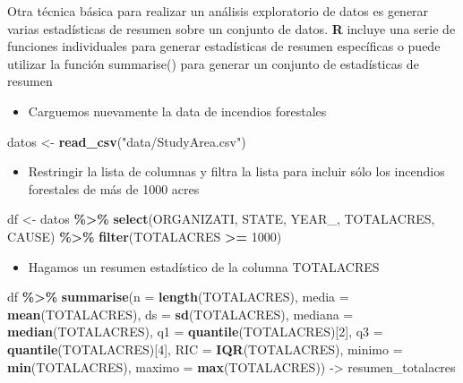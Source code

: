 \documentclass[
]{book}
\newenvironment{Shaded}{\begin{snugshade}}{\end{snugshade}}
\newcommand{\AttributeTok}[1]{\textcolor[rgb]{0.13,0.29,0.53}{#1}}
\newcommand{\DecValTok}[1]{\textcolor[rgb]{0.00,0.00,0.81}{#1}}
\newcommand{\FunctionTok}[1]{\textcolor[rgb]{0.13,0.29,0.53}{\textbf{#1}}}
\newcommand{\NormalTok}[1]{#1}
\newcommand{\OtherTok}[1]{\textcolor[rgb]{0.56,0.35,0.01}{#1}}
\newcommand{\SpecialCharTok}[1]{\textcolor[rgb]{0.81,0.36,0.00}{\textbf{#1}}}
\newcommand{\StringTok}[1]{\textcolor[rgb]{0.31,0.60,0.02}{#1}}
\providecommand{\tightlist}{%
  \setlength{\itemsep}{0pt}\setlength{\parskip}{0pt}}
\begin{document}
Otra técnica básica para realizar un análisis exploratorio de datos es generar varias estadísticas de resumen sobre un conjunto de datos. \textbf{R} incluye una serie de funciones individuales para generar estadísticas de resumen específicas o puede utilizar la función summarise() para generar un conjunto de estadísticas de resumen

\begin{itemize}
\tightlist
\item
  Carguemos nuevamente la data de incendios forestales
\end{itemize}

\begin{Shaded}
\begin{Highlighting}[]
\NormalTok{datos }\OtherTok{\textless{}{-}} \FunctionTok{read\_csv}\NormalTok{(}\StringTok{"data/StudyArea.csv"}\NormalTok{)}
\end{Highlighting}
\end{Shaded}

\begin{itemize}
\tightlist
\item
  Restringir la lista de columnas y filtra la lista para incluir sólo los incendios forestales de más de 1000 acres
\end{itemize}

\begin{Shaded}
\begin{Highlighting}[]
\NormalTok{df }\OtherTok{\textless{}{-}}\NormalTok{ datos }\SpecialCharTok{\%\textgreater{}\%}
  \FunctionTok{select}\NormalTok{(ORGANIZATI, STATE, YEAR\_, TOTALACRES, CAUSE) }\SpecialCharTok{\%\textgreater{}\%} 
  \FunctionTok{filter}\NormalTok{(TOTALACRES }\SpecialCharTok{\textgreater{}=} \DecValTok{1000}\NormalTok{)}
\end{Highlighting}
\end{Shaded}

\begin{itemize}
\tightlist
\item
  Hagamos un resumen estadístico de la columna TOTALACRES
\end{itemize}

\begin{Shaded}
\begin{Highlighting}[]
\NormalTok{df }\SpecialCharTok{\%\textgreater{}\%} 
  \FunctionTok{summarise}\NormalTok{(}\AttributeTok{n =} \FunctionTok{length}\NormalTok{(TOTALACRES),}
            \AttributeTok{media =} \FunctionTok{mean}\NormalTok{(TOTALACRES),}
            \AttributeTok{ds =} \FunctionTok{sd}\NormalTok{(TOTALACRES),}
            \AttributeTok{mediana =} \FunctionTok{median}\NormalTok{(TOTALACRES),}
            \AttributeTok{q1 =} \FunctionTok{quantile}\NormalTok{(TOTALACRES)[}\DecValTok{2}\NormalTok{],}
            \AttributeTok{q3 =} \FunctionTok{quantile}\NormalTok{(TOTALACRES)[}\DecValTok{4}\NormalTok{],}
            \AttributeTok{RIC =} \FunctionTok{IQR}\NormalTok{(TOTALACRES),}
            \AttributeTok{minimo =} \FunctionTok{min}\NormalTok{(TOTALACRES),}
            \AttributeTok{maximo =} \FunctionTok{max}\NormalTok{(TOTALACRES)) }\OtherTok{{-}\textgreater{}}\NormalTok{ resumen\_totalacres}
\end{Highlighting}
\end{Shaded}
\end{document}
